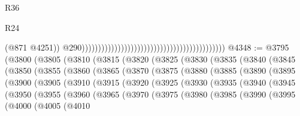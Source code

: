 \begin{lexlean}{R36}
\begin{lexlean}{R24}
\begin{coremodule}
{{{{{{{{{{{{{{{{{{{{{{{{{{{{{{{{{{{{{{{{{{{{{{{{{{{{{{{{{{{{{{{{{{{{{{{{{{{{{{{{{{{{{{{{{{{{{{{{{{{{{{{{{{{{{{{{{{{{{{{{{{{{{{{{{{{{{{{{{{{{{{{{{{{{{{{{{{{{{{{{{{{{{{{{{{{{{{{{{{{{{{{{{{{{{{{{{{{                                                                                              (@871
                                                                                                @4251))
                                                                                            @290))))))))))))))))))))))))))))))))))))))))))))
@4348 := @3795
    (@3800
      (@3805
        (@3810
          (@3815
            (@3820
              (@3825
                (@3830
                  (@3835
                    (@3840
                      (@3845
                        (@3850
                          (@3855
                            (@3860
                              (@3865
                                (@3870
                                  (@3875
                                    (@3880
                                      (@3885
                                        (@3890
                                          (@3895
                                            (@3900
                                              (@3905
                                                (@3910
                                                  (@3915
                                                    (@3920
                                                      (@3925
                                                        (@3930
                                                          (@3935
                                                            (@3940
                                                              (@3945
                                                                (@3950
                                                                  (@3955
                                                                    (@3960
                                                                      (@3965
                                                                        (@3970
                                                                          (@3975
                                                                            (@3980
                                                                              (@3985
                                                                                (@3990
                                                                                  (@3995
                                                                                    (@4000
                                                                                      (@4005
                                                                                        (@4010
}}}}}}}}}}}}}}}}}}}}}}}}}}}}}}}}}}}}}}}}}}}}}}}}}}}}}}}}}}}}}}}}}}}}}}}}}}}}}}}}}}}}}}}}}}}}}}}}}}}}}}}}}}}}}}}}}}}}}}}}}}}}}}}}}}}}}}}}}}}}}}}}}}}}}}}}}}}}}}}}}}}}}}}}}}}}}}}}}}}}}}}}}}}}}}}}}}}
\end{coremodule}
\end{lexlean}
\end{lexlean}

